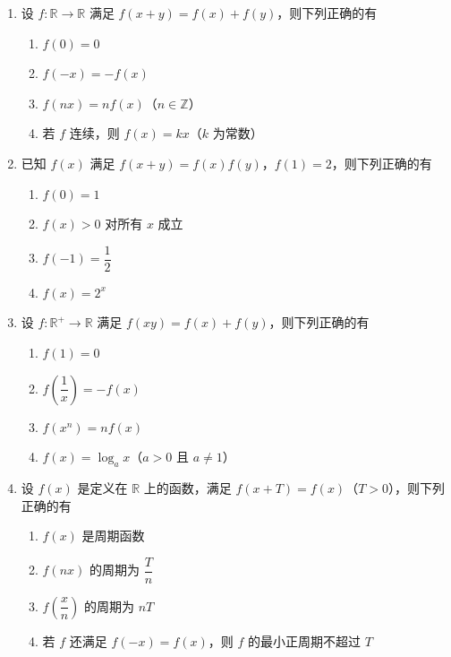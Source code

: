 \documentclass[12pt, a4paper]{ctexart}
\newcommand{\score}[1]{\hfill\makebox[2cm][l]{(#1分)}}
\begin{document}
\begin{enumerate}[resume]
\item 设 $f: \mathbb{R} \to \mathbb{R}$ 满足 $f(x+y) = f(x) + f(y)$，则下列正确的有\score{5}
\begin{enumerate}[label=\Alph*.]
\item $f(0) = 0$
\item $f(-x) = -f(x)$
\item $f(nx) = nf(x)$（$n \in \mathbb{Z}$）
\item 若 $f$ 连续，则 $f(x) = kx$（$k$ 为常数）
\end{enumerate}

\item 已知 $f(x)$ 满足 $f(x+y) = f(x)f(y)$，$f(1) = 2$，则下列正确的有\score{5}
\begin{enumerate}[label=\Alph*.]
\item $f(0) = 1$
\item $f(x) > 0$ 对所有 $x$ 成立
\item $f(-1) = \dfrac{1}{2}$
\item $f(x) = 2^x$
\end{enumerate}

\item 设 $f: \mathbb{R}^+ \to \mathbb{R}$ 满足 $f(xy) = f(x) + f(y)$，则下列正确的有\score{5}
\begin{enumerate}[label=\Alph*.]
\item $f(1) = 0$
\item $f\left(\dfrac{1}{x}\right) = -f(x)$
\item $f(x^n) = nf(x)$
\item $f(x) = \log_a x$（$a > 0$ 且 $a \neq 1$）
\end{enumerate}

\item 设 $f(x)$ 是定义在 $\mathbb{R}$ 上的函数，满足 $f(x+T) = f(x)$（$T > 0$），则下列正确的有\score{5}
\begin{enumerate}[label=\Alph*.]
\item $f(x)$ 是周期函数
\item $f(nx)$ 的周期为 $\dfrac{T}{n}$
\item $f\left(\dfrac{x}{n}\right)$ 的周期为 $nT$
\item 若 $f$ 还满足 $f(-x) = f(x)$，则 $f$ 的最小正周期不超过 $T$
\end{enumerate}

\end{enumerate}

\vspace{0.5cm}
\end{document}
